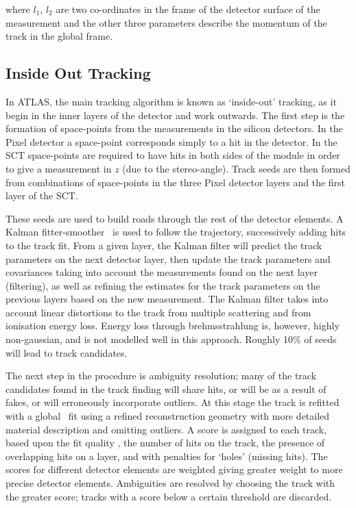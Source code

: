 where $l_{1}$, $l_{2}$ are two co-ordinates in the frame of the detector surface
of the measurement and the other three parameters describe the momentum of the track
in the global frame.

\subsection{Inside Out Tracking}

In ATLAS, the main tracking algorithm is known as `inside-out' tracking, as it
begin in the inner layers of the detector and work outwards. The first step is
the formation of space-points from the measurements in the silicon detectors. In
the Pixel detector a space-point corresponds simply to a hit in the detector. In
the SCT space-points are required to have hits in both sides of the module in
order to give a measurement in $z$ (due to the stereo-angle). Track seeds are
then formed from combinations of space-points in the three Pixel detector layers
and the first layer of the SCT. 

These seeds are used to build roads through the
rest of the detector elements. A Kalman fitter-smoother~\cite{Fruhwirth:1987fm} is used to follow the
trajectory, successively adding hits to the track fit. From a given layer, the
Kalman filter will predict the track parameters on the next detector layer, then
update the track parameters and covariances taking into account the measurements
found on the next layer (filtering), as well as refining the estimates for the
track parameters on the previous layers based on the new measurement. The Kalman
filter takes into account linear distortions to the track from multiple
scattering and from ionisation energy loss. Energy loss through brehmsstrahlung
is, however, highly non-gaussian, and is not modelled well in this approach. Roughly
10\% of seeds will lead to track candidates.

The next step in the procedure is ambiguity resolution; many of the track
candidates found in the track finding will share hits, or will be as a result of
fakes, or will erroneously incorporate outliers. At this stage the track is
refitted with a global \chisquared\ fit using a refined reconstruction geometry
with more detailed material description and omitting outliers. 
A score is assigned to each track, based upon the fit quality \chisquaredndof,
the number of hits on the track, the presence of overlapping hits on a layer,
and with
penalties for `holes' (missing hits). The scores for different detector elements
are weighted giving greater weight to more precise detector elements. Ambiguities
are resolved by choosing the track with the greater score; tracks with a score
below a certain threshold are discarded.

